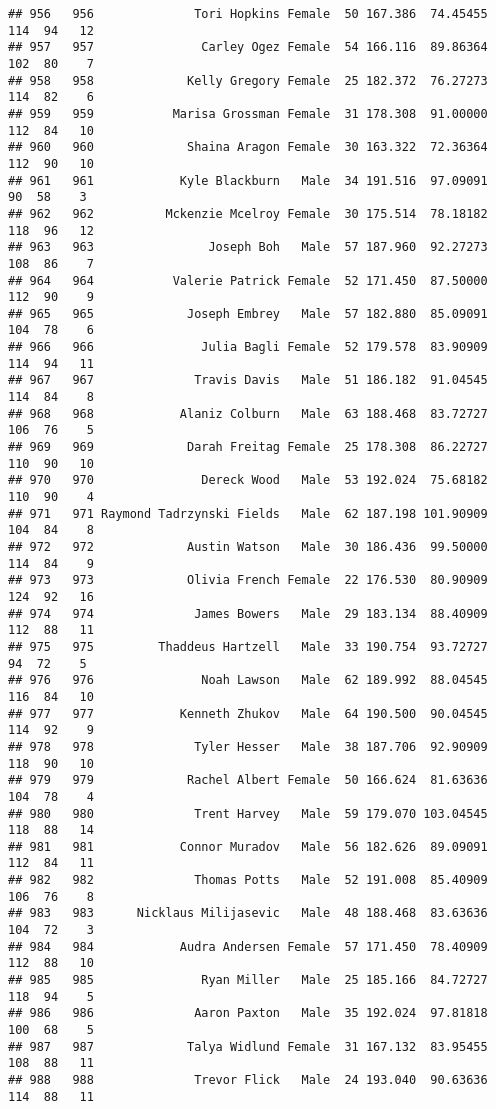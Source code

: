 \documentclass[
]{article}
\begin{document}
\begin{verbatim}
## 956   956              Tori Hopkins Female  50 167.386  74.45455 114  94   12
## 957   957               Carley Ogez Female  54 166.116  89.86364 102  80    7
## 958   958             Kelly Gregory Female  25 182.372  76.27273 114  82    6
## 959   959           Marisa Grossman Female  31 178.308  91.00000 112  84   10
## 960   960             Shaina Aragon Female  30 163.322  72.36364 112  90   10
## 961   961            Kyle Blackburn   Male  34 191.516  97.09091  90  58    3
## 962   962          Mckenzie Mcelroy Female  30 175.514  78.18182 118  96   12
## 963   963                Joseph Boh   Male  57 187.960  92.27273 108  86    7
## 964   964           Valerie Patrick Female  52 171.450  87.50000 112  90    9
## 965   965             Joseph Embrey   Male  57 182.880  85.09091 104  78    6
## 966   966               Julia Bagli Female  52 179.578  83.90909 114  94   11
## 967   967              Travis Davis   Male  51 186.182  91.04545 114  84    8
## 968   968            Alaniz Colburn   Male  63 188.468  83.72727 106  76    5
## 969   969             Darah Freitag Female  25 178.308  86.22727 110  90   10
## 970   970               Dereck Wood   Male  53 192.024  75.68182 110  90    4
## 971   971 Raymond Tadrzynski Fields   Male  62 187.198 101.90909 104  84    8
## 972   972             Austin Watson   Male  30 186.436  99.50000 114  84    9
## 973   973             Olivia French Female  22 176.530  80.90909 124  92   16
## 974   974              James Bowers   Male  29 183.134  88.40909 112  88   11
## 975   975         Thaddeus Hartzell   Male  33 190.754  93.72727  94  72    5
## 976   976               Noah Lawson   Male  62 189.992  88.04545 116  84   10
## 977   977            Kenneth Zhukov   Male  64 190.500  90.04545 114  92    9
## 978   978              Tyler Hesser   Male  38 187.706  92.90909 118  90   10
## 979   979             Rachel Albert Female  50 166.624  81.63636 104  78    4
## 980   980              Trent Harvey   Male  59 179.070 103.04545 118  88   14
## 981   981            Connor Muradov   Male  56 182.626  89.09091 112  84   11
## 982   982              Thomas Potts   Male  52 191.008  85.40909 106  76    8
## 983   983      Nicklaus Milijasevic   Male  48 188.468  83.63636 104  72    3
## 984   984            Audra Andersen Female  57 171.450  78.40909 112  88   10
## 985   985               Ryan Miller   Male  25 185.166  84.72727 118  94    5
## 986   986              Aaron Paxton   Male  35 192.024  97.81818 100  68    5
## 987   987             Talya Widlund Female  31 167.132  83.95455 108  88   11
## 988   988              Trevor Flick   Male  24 193.040  90.63636 114  88   11

\end{verbatim}
\end{document}
